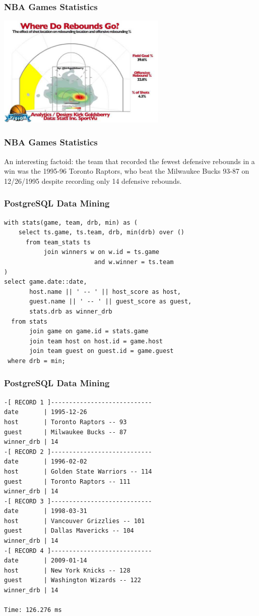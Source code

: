 \documentclass{beamer}
\begin{document}
\begin{frame}
  \frametitle{NBA Games Statistics}

  \begin{center}
    \includegraphics[height=2.1in]{reboundsc1.jpg}
  \end{center}
\end{frame}

\begin{frame}
  \frametitle{NBA Games Statistics}

  An interesting factoid: the team that recorded the fewest defensive
  rebounds in a win was the 1995-96 Toronto Raptors, who beat the Milwaukee
  Bucks 93-87 on 12/26/1995 despite recording only 14 defensive rebounds.
\end{frame}

\begin{frame}[fragile]
  \frametitle{PostgreSQL Data Mining}

\begin{verbatim}
with stats(game, team, drb, min) as (
    select ts.game, ts.team, drb, min(drb) over ()
      from team_stats ts
           join winners w on w.id = ts.game
                         and w.winner = ts.team
)
select game.date::date,
       host.name || ' -- ' || host_score as host,
       guest.name || ' -- ' || guest_score as guest,
       stats.drb as winner_drb
  from stats
       join game on game.id = stats.game
       join team host on host.id = game.host
       join team guest on guest.id = game.guest
 where drb = min;
\end{verbatim}
\end{frame}

\begin{frame}[fragile]
  \frametitle{PostgreSQL Data Mining}

\begin{verbatim}
-[ RECORD 1 ]----------------------------
date       | 1995-12-26
host       | Toronto Raptors -- 93
guest      | Milwaukee Bucks -- 87
winner_drb | 14
-[ RECORD 2 ]----------------------------
date       | 1996-02-02
host       | Golden State Warriors -- 114
guest      | Toronto Raptors -- 111
winner_drb | 14
-[ RECORD 3 ]----------------------------
date       | 1998-03-31
host       | Vancouver Grizzlies -- 101
guest      | Dallas Mavericks -- 104
winner_drb | 14
-[ RECORD 4 ]----------------------------
date       | 2009-01-14
host       | New York Knicks -- 128
guest      | Washington Wizards -- 122
winner_drb | 14

Time: 126.276 ms
\end{verbatim}
\end{frame}
\end{document}
